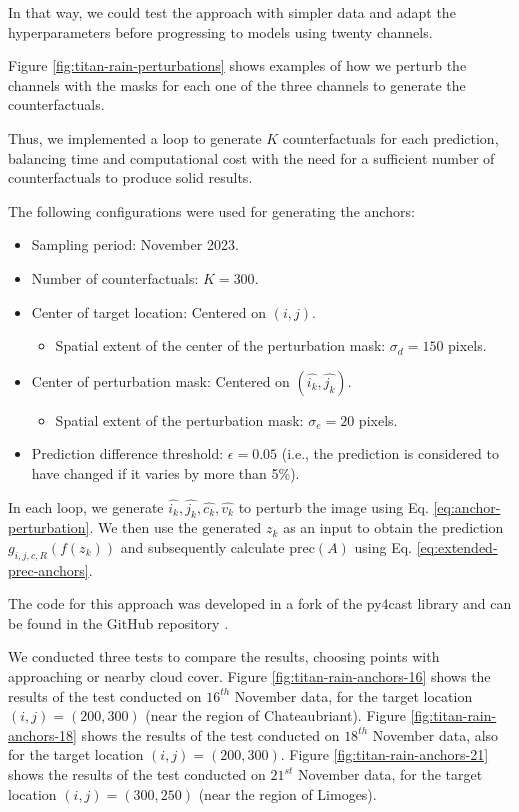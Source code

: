 In that way, we could test the approach with simpler data and adapt the hyperparameters before progressing to models using twenty channels.

Figure \ref{fig:titan-rain-perturbations} shows examples of how we perturb the channels with the masks for each one of the three channels to generate the counterfactuals.



Thus, we implemented a loop to generate $K$ counterfactuals for each prediction, balancing time and computational cost with the need for a sufficient number of counterfactuals to produce solid results.

The following configurations were used for generating the anchors:
\begin{itemize}
    \item Sampling period: November 2023.
    \item Number of counterfactuals: $K = 300$.
    \item Center of target location: Centered on $(i, j)$.
    \begin{itemize}
        \item Spatial extent of the center of the perturbation mask: $\sigma_d = 150$ pixels.
    \end{itemize}
    \item Center of perturbation mask: Centered on $(\widehat{i_k}, \widehat{j_k})$.
    \begin{itemize}
        \item Spatial extent of the perturbation mask: $\sigma_e = 20$ pixels.
    \end{itemize}
    \item Prediction difference threshold: $\epsilon = 0.05$ (i.e., the prediction is considered to have changed if it varies by more than 5\%).
\end{itemize}

In each loop, we generate $\widehat{i_k}, \widehat{j_k}, \widehat{c_k}, \widehat{v_k}$ to perturb the image using Eq. \ref{eq:anchor-perturbation}. We then use the generated $z_k$ as an input to obtain the prediction $g_{i,j,c,R}(f(z_k))$ and subsequently calculate $\text{prec}(A)$ using Eq. \ref{eq:extended-prec-anchors}.

The code for this approach was developed in a fork of the py4cast library and can be found in the GitHub repository \cite{py4cast-xai}.

We conducted three tests to compare the results, choosing points with approaching or nearby cloud cover.
Figure \ref{fig:titan-rain-anchors-16} shows the results of the test conducted on $16^{th}$ November data, for the target location $(i, j) = (200, 300)$ (near the region of Chateaubriant).
Figure \ref{fig:titan-rain-anchors-18} shows the results of the test conducted on $18^{th}$ November data, also for the target location $(i, j) = (200, 300)$.
Figure \ref{fig:titan-rain-anchors-21} shows the results of the test conducted on $21^{st}$ November data, for the target location $(i, j) = (300, 250)$ (near the region of Limoges).

